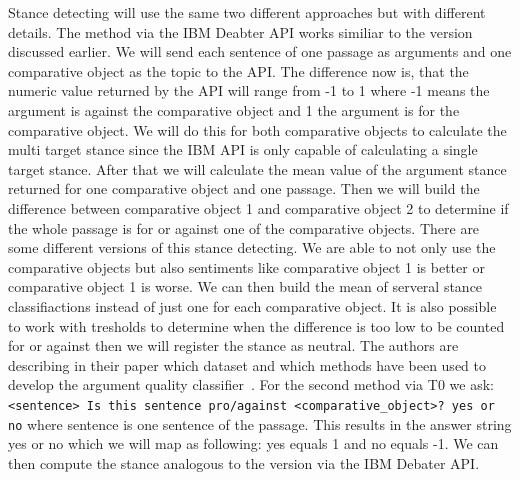         Stance detecting will use the same two different approaches but with different details. The method via the IBM Deabter API works similiar to the version discussed earlier. We will send each sentence of one passage as arguments and one comparative object as the topic to the API. The difference now is, that the  numeric value returned by the API will range from -1 to 1 where -1 means the argument  is against the comparative object and 1 the argument is for the comparative object. We will do this for both comparative objects to calculate the multi target stance since the IBM API is only capable of calculating a single target stance. After that we will calculate the mean value of the argument stance returned for one comparative object and one passage. Then we will build the difference between comparative object 1 and comparative object 2 to determine if the whole passage is for or against one of the comparative objects. There are some different versions of this stance detecting. We are able to not only use the comparative objects but also sentiments like comparative object 1 is better or comparative object 1 is worse. We can then build the mean of serveral stance classifiactions instead of just one for each comparative object. It is also possible to work with tresholds to determine when the difference is too low to be counted for or against then we will register the stance as neutral.  The authors \citeauthor{BarHaimBDSS2017} are describing in their paper which dataset and which methods have been used to develop the argument quality classifier~\cite{BarHaimBDSS2017}. For the second method via T0 we ask: \texttt{<sentence> Is this sentence pro/against <comparative\_object>? yes or no} where sentence is one sentence of the passage. This results in the answer string yes or no which we will map as following: yes equals 1 and no equals -1. We can then compute the stance analogous to the version via the IBM Debater API.
